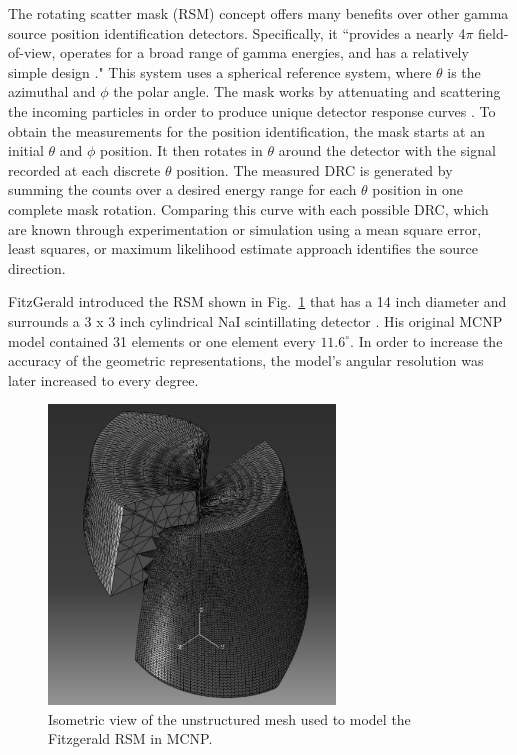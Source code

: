 \documentclass[3p,times]{elsarticle}
\begin{document}
The rotating scatter mask (RSM) concept offers many benefits over other gamma source position identification detectors.  
Specifically, it ``provides a nearly 4$\pi$ field-of-view, operates for a broad range of gamma energies, and has a relatively simple design \cite{Logan2017}." 
This system uses a spherical reference system, where $\theta$ is the azimuthal and $\phi$ the polar angle.  
The mask works by attenuating and scattering the incoming particles in order to produce unique detector response curves \cite{Logan2017}.  
To obtain the measurements for the position identification, the mask starts at an initial $\theta$ and $\phi$ position.
It then rotates in $\theta$ around the detector with the signal recorded at each discrete $\theta$ position.  
The measured DRC is generated by summing the counts over a desired energy range for each $\theta$ position in one complete mask rotation.  
Comparing this curve with each possible DRC, which are known through experimentation or simulation using a mean square error, least squares, or maximum likelihood estimate approach identifies the source direction.

FitzGerald introduced the RSM shown in Fig.~\ref{fig:RSM} that has a 14 inch diameter and surrounds a 3 x 3 inch cylindrical NaI scintillating detector \cite{FitzGerald2015}. 
His original MCNP model contained 31 elements or one element every $11.6^\circ$.  
In order to increase the accuracy of the geometric representations,  the model's angular resolution was later increased to every degree.  

\begin{figure}[ht!]
\includegraphics[width={3.0in}]{../figs/P2AtIso.pdf}
\centering
\caption{Isometric view of the unstructured mesh used to model the Fitzgerald RSM in MCNP.}
\label{fig:RSM}
\end{figure}
\end{document}
